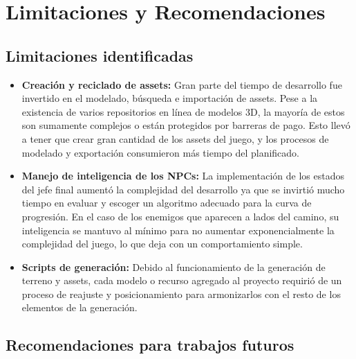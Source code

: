 \section{Limitaciones y Recomendaciones}

\subsection{Limitaciones identificadas}

\begin{itemize}
    \item \textbf{Creación y reciclado de assets:} Gran parte del tiempo de desarrollo fue invertido en el modelado, búsqueda e importación de assets. Pese a la existencia de varios repositorios en línea de modelos 3D, la mayoría de estos son sumamente complejos o están protegidos por barreras de pago. Esto llevó a tener que crear gran cantidad de los assets del juego, y los procesos de modelado y exportación consumieron más tiempo del planificado.
    
    \item \textbf{Manejo de inteligencia de los NPCs:} La implementación de los estados del jefe final aumentó la complejidad del desarrollo ya que se invirtió mucho tiempo en evaluar y escoger un algoritmo adecuado para la curva de progresión. En el caso de los enemigos que aparecen a lados del camino, su inteligencia se mantuvo al mínimo para no aumentar exponencialmente la complejidad del juego, lo que deja con un comportamiento simple.
    
    \item \textbf{Scripts de generación:} Debido al funcionamiento de la generación de terreno y assets, cada modelo o recurso agregado al proyecto requirió de un proceso de reajuste y posicionamiento para armonizarlos con el resto de los elementos de la generación.
\end{itemize}

\subsection{Recomendaciones para trabajos futuros}


